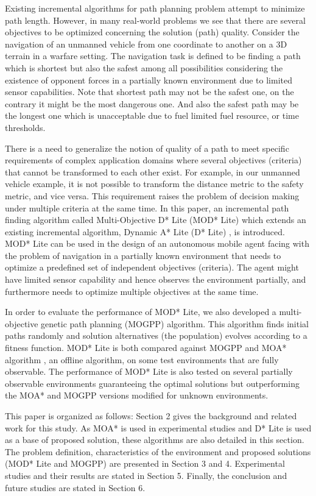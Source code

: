 \documentclass[10pt,journal]{IEEEtran}
\begin{document}
Existing incremental algorithms for path planning problem attempt to minimize path length. However, in many real-world problems we see that there are several objectives to be optimized concerning the solution (path) quality. Consider the navigation of an unmanned vehicle from one coordinate to another on a 3D terrain in a warfare setting. The navigation task is defined to be finding a path which is shortest but also the safest among all possibilities considering the existence of opponent forces in a partially known environment due to limited sensor capabilities. Note that shortest path may not be the safest one, on the contrary it might be the most dangerous one. And also the safest path may be the longest one which is unacceptable due to fuel limited fuel resource, or time thresholds. 

There is a need to generalize the notion of quality of a path to meet specific requirements of complex application domains where several objectives (criteria) that cannot be transformed to each other exist. For example, in our unmanned vehicle example, it is not possible to transform the distance metric to the safety metric, and vice versa. This requirement raises the problem of  decision making under multiple criteria at the same time. In this paper, an incremental path finding algorithm called Multi-Objective D* Lite (MOD* Lite) which extends an existing incremental algorithm, Dynamic A* Lite (D* Lite) \cite{Koenig:2002}, is introduced. MOD* Lite \cite{Oral:2012} can be used in the design of an autonomous mobile agent facing with the problem of navigation in a partially known environment that needs to optimize a predefined set of independent objectives (criteria). The agent might have limited sensor capability and hence observes the environment partially, and furthermore needs to optimize multiple objectives at the same time.

In order to evaluate the performance of MOD* Lite, we also developed a multi-objective genetic path planning (MOGPP) algorithm. This algorithm finds initial paths randomly and solution alternatives (the population) evolves according to a fitness function. MOD* Lite is both compared against MOGPP and MOA* algorithm \cite{MOAStewart:1991}, an offline algorithm, on some test environments that are fully observable. The performance of MOD* Lite is also tested on several partially observable environments guaranteeing the optimal solutions but outperforming the MOA* and MOGPP versions modified for unknown environments.

This paper is organized as follows: Section 2 gives the background and related work for this study. As MOA* is used in experimental studies and D* Lite is used as a base of proposed solution, these algorithms are also detailed in this section. The problem definition, characteristics of the environment and proposed solutions (MOD* Lite and MOGPP) are presented in Section 3 and 4. Experimental studies and their results are stated in Section 5. Finally, the conclusion and future studies are stated in Section 6.
\end{document}
